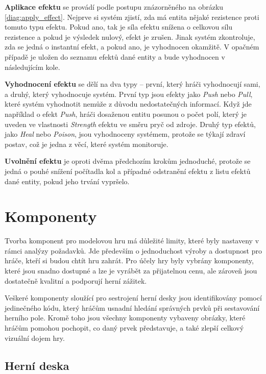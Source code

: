 \textbf{Aplikace efektu} se provádí podle postupu znázorněného na obrázku \ref{diag:apply_effect}. Nejprve si systém zjistí, zda má entita nějaké rezistence proti tomuto typu efektu. Pokud ano, tak je síla efektu snížena o celkovou sílu rezistence a pokud je výsledek nulový, efekt je zrušen. Jinak systém zkontroluje, zda se jedná o instantní efekt, a pokud ano, je vyhodnocen okamžitě. V opačném případě je uložen do seznamu efektů dané entity a bude vyhodnocen v následujícím kole.

\textbf{Vyhodnocení efektu} se dělí na dva typy -- první, který hráči vyhodnocují sami, a druhý, který vyhodnocuje systém. První typ jsou efekty jako \textit{Push} nebo \textit{Pull}, které systém vyhodnotit nemůže z důvodu nedostatečných informací. Když jde například o efekt \textit{Push}, hráči dosaženou entitu posunou o počet polí, který je uveden ve vlastnosti \textit{Strength} efektu ve směru pryč od zdroje. Druhý typ efektů, jako \textit{Heal} nebo \textit{Poison}, jsou vyhodnoceny systémem, protože se týkají zdraví postav, což je jedna z věcí, které systém monitoruje.

\textbf{Uvolnění efektu} je oproti dvěma předchozím krokům jednoduché, protože se jedná o pouhé snížení počítadla kol a případné odstranění efektu z listu efektů dané entity, pokud jeho trvání vypršelo.


\section{Komponenty}
\label{sec:design_components}

Tvorba komponent pro modelovou hru má důležité limity, které byly nastaveny v rámci analýzy požadavků. Jde především o jednoduchost výroby a dostupnost pro hráče, kteří si budou chtít hru zahrát. Pro účely hry byly vybrány komponenty, které jsou snadno dostupné a lze je vyrábět za přijatelnou cenu, ale zároveň jsou dostatečně kvalitní a podporují herní zážitek.

Veškeré komponenty sloužící pro sestrojení herní desky jsou identifikovány pomocí jedinečného kódu, který hráčům usnadní hledání správných prvků při sestavování herního pole. Kromě toho jsou všechny komponenty vybaveny obrázky, které hráčům pomohou pochopit, co daný prvek představuje, a také zlepší celkový vizuální dojem hry.

\subsection{Herní deska}
\label{subsec:design_board}

